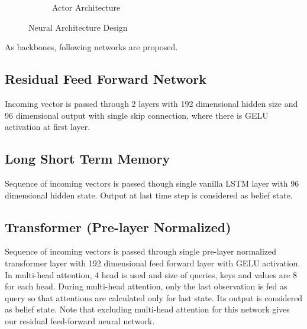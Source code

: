 \begin{figure}
\begin{subfigure}{.5\textwidth}
		\caption{Actor Architecture}
		\label{fig:actor_net}
	\end{subfigure}
	\caption{Neural Architecture Design}
	\label{fig:nets}
\end{figure}

As backbones, following networks are proposed. 

\subsection{Residual Feed Forward Network}

Incoming vector is passed through 2 layers with 192 dimensional hidden size and 96 dimensional output with single skip connection, where there is GELU activation at first layer. 

\subsection{Long Short Term Memory}

Sequence of incoming vectors is passed though single vanilla LSTM layer with 96 dimensional hidden state. 
Output at last time step is considered as belief state. 

\subsection{Transformer (Pre-layer Normalized)}

Sequence of incoming vectors is passed through single pre-layer normalized transformer layer with 192 dimensional feed forward layer with GELU activation. 
In multi-head attention, 4 head is used and size of queries, keys and values are 8 for each head.
During multi-head attention, only the last observation is fed as query so that attentions are calculated only for last state.  
Its output is considered as belief state.
Note that excluding multi-head attention for this network gives our residual feed-forward neural network.
